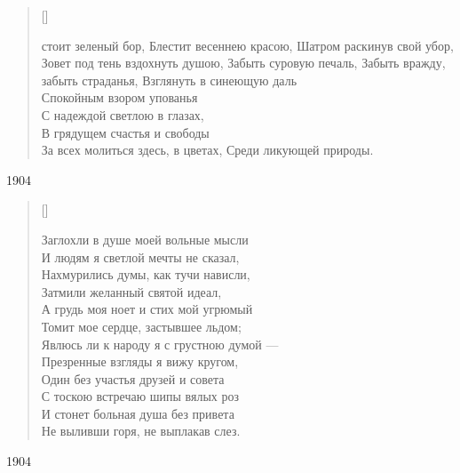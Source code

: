 \settowidth{\versewidth}{За всех молиться здесь, в цветах}
\begin{verse}[\versewidth]
\begin{patverse*}
 стоит зеленый бор,
Блестит весеннею красою,
Шатром раскинув свой убор,
Зовет под тень вздохнуть душою,
Забыть суровую печаль,
Забыть вражду, забыть страданья,
Взглянуть в синеющую даль\\
Спокойным взором упованья\\
С надеждой светлою в глазах,\\
В грядущем счастья и свободы\\
За всех молиться здесь, в цветах,
Среди ликующей природы.
\end{patverse*}
\end{verse}
1904




\settowidth{\versewidth}{Заглохли в душе моей вольные мысли}
\begin{verse}[\versewidth]
\begin{altverse}
Заглохли в душе моей вольные мысли\\
И людям я светлой мечты не сказал,\\
Нахмурились думы, как тучи нависли,\\
Затмили желанный святой идеал,\\
А грудь моя ноет и стих мой угрюмый\\
Томит мое сердце, застывшее льдом;\\
Явлюсь ли к народу я с грустною думой ---\\
Презренные взгляды я вижу кругом,\\
Один без участья друзей и совета\\
С тоскою встречаю шипы вялых роз\\
И стонет больная душа без привета\\
Не выливши горя, не выплакав слез.
\end{altverse}
\end{verse}
1904



